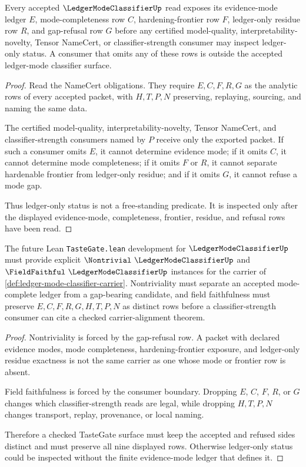 \begin{theorem}
\label{thm:ledger-mode-classifier-consumer-boundary}
Every accepted $\LedgerModeClassifierUp$ read exposes its evidence-mode ledger $E$, mode-completeness row $C$, hardening-frontier row $F$, ledger-only residue row $R$, and gap-refusal row $G$ before any certified model-quality, interpretability-novelty, Tensor NameCert, or classifier-strength consumer may inspect ledger-only status. A consumer that omits any of these rows is outside the accepted ledger-mode classifier surface.
\end{theorem}
\begin{proof}
Read the NameCert obligations. They require $E,C,F,R,G$ as the analytic rows of every accepted packet, with $H,T,P,N$ preserving, replaying, sourcing, and naming the same data.

The certified model-quality, interpretability-novelty, Tensor NameCert, and classifier-strength consumers named by $P$ receive only the exported packet. If such a consumer omits $E$, it cannot determine evidence mode; if it omits $C$, it cannot determine mode completeness; if it omits $F$ or $R$, it cannot separate hardenable frontier from ledger-only residue; and if it omits $G$, it cannot refuse a mode gap.

Thus ledger-only status is not a free-standing predicate. It is inspected only after the displayed evidence-mode, completeness, frontier, residue, and refusal rows have been read.
\end{proof}

\begin{theorem}
\label{thm:ledger-mode-classifier-tastegate-boundary}
The future Lean \texttt{TasteGate.lean} development for $\LedgerModeClassifierUp$ must provide explicit $\Nontrivial\ \LedgerModeClassifierUp$ and $\FieldFaithful\ \LedgerModeClassifierUp$ instances for the carrier of \autoref{def:ledger-mode-classifier-carrier}. Nontriviality must separate an accepted mode-complete ledger from a gap-bearing candidate, and field faithfulness must preserve $E,C,F,R,G,H,T,P,N$ as distinct rows before a classifier-strength consumer can cite a checked carrier-alignment theorem.
\end{theorem}
\begin{proof}
Nontriviality is forced by the gap-refusal row. A packet with declared evidence modes, mode completeness, hardening-frontier exposure, and ledger-only residue exactness is not the same carrier as one whose mode or frontier row is absent.

Field faithfulness is forced by the consumer boundary. Dropping $E$, $C$, $F$, $R$, or $G$ changes which classifier-strength reads are legal, while dropping $H,T,P,N$ changes transport, replay, provenance, or local naming.

Therefore a checked TasteGate surface must keep the accepted and refused sides distinct and must preserve all nine displayed rows. Otherwise ledger-only status could be inspected without the finite evidence-mode ledger that defines it.
\end{proof}

